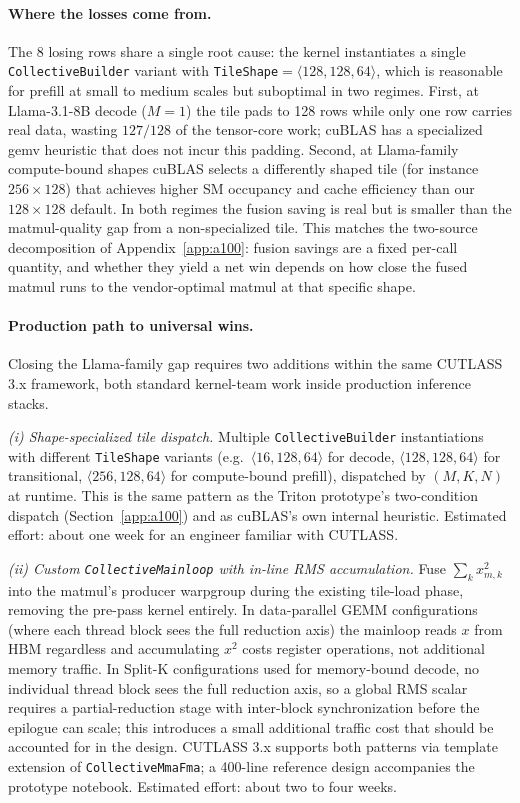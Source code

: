 \documentclass{article}
\begin{document}
\paragraph{Where the losses come from.} The 8 losing rows share a single root cause: the kernel instantiates a single \texttt{CollectiveBuilder} variant with \texttt{TileShape}$=\langle 128, 128, 64 \rangle$, which is reasonable for prefill at small to medium scales but suboptimal in two regimes. First, at Llama-3.1-8B decode ($M{=}1$) the tile pads to 128 rows while only one row carries real data, wasting $127/128$ of the tensor-core work; cuBLAS has a specialized gemv heuristic that does not incur this padding. Second, at Llama-family compute-bound shapes cuBLAS selects a differently shaped tile (for instance $256{\times}128$) that achieves higher SM occupancy and cache efficiency than our $128{\times}128$ default. In both regimes the fusion saving is real but is smaller than the matmul-quality gap from a non-specialized tile. This matches the two-source decomposition of Appendix~\ref{app:a100}: fusion savings are a fixed per-call quantity, and whether they yield a net win depends on how close the fused matmul runs to the vendor-optimal matmul at that specific shape.

\paragraph{Production path to universal wins.} Closing the Llama-family gap requires two additions within the same CUTLASS 3.x framework, both standard kernel-team work inside production inference stacks.

\textit{(i) Shape-specialized tile dispatch.} Multiple \texttt{CollectiveBuilder} instantiations with different \texttt{TileShape} variants (e.g.\ $\langle 16, 128, 64 \rangle$ for decode, $\langle 128, 128, 64 \rangle$ for transitional, $\langle 256, 128, 64 \rangle$ for compute-bound prefill), dispatched by $(M, K, N)$ at runtime. This is the same pattern as the Triton prototype's two-condition dispatch (Section~\ref{app:a100}) and as cuBLAS's own internal heuristic. Estimated effort: about one week for an engineer familiar with CUTLASS.

\textit{(ii) Custom \texttt{CollectiveMainloop} with in-line RMS accumulation.} Fuse $\sum_k x^2_{m,k}$ into the matmul's producer warpgroup during the existing tile-load phase, removing the pre-pass kernel entirely. In data-parallel GEMM configurations (where each thread block sees the full reduction axis) the mainloop reads $x$ from HBM regardless and accumulating $x^2$ costs register operations, not additional memory traffic. In Split-K configurations used for memory-bound decode, no individual thread block sees the full reduction axis, so a global RMS scalar requires a partial-reduction stage with inter-block synchronization before the epilogue can scale; this introduces a small additional traffic cost that should be accounted for in the design. CUTLASS 3.x supports both patterns via template extension of \texttt{CollectiveMmaFma}; a 400-line reference design accompanies the prototype notebook. Estimated effort: about two to four weeks.
\end{document}
